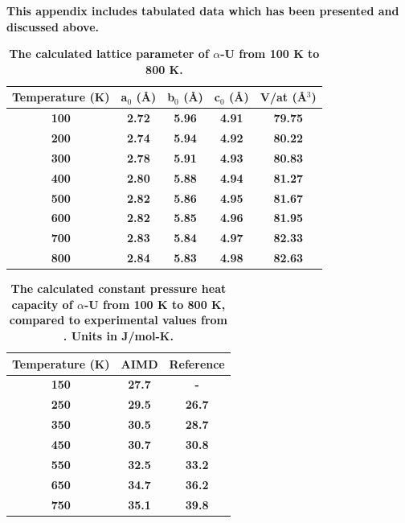 \documentclass[utf8]{frontiersSCNS} %
\providecommand{\DIFaddtex}[1]{{\bf #1}} %
\providecommand{\DIFaddFL}[1]{\DIFadd{#1}} %
\providecommand{\DIFadd}[1]{\texorpdfstring{\DIFaddtex{#1}}{#1}} %
\begin{document}
\DIFadd{This appendix includes tabulated data which has been presented and discussed above. 
}

\setcounter{table}{0}
\renewcommand{\thetable}{A\arabic{table}}

\begin{table}[h]
\caption{\DIFaddFL{The calculated lattice parameter of $\alpha$-U from 100 K to 800 K.}} \label{tab:lat}
\begin{center}
\begin{tabular}{|c|c|c|c|c|}
	\hline
	\DIFaddFL{Temperature (K) }& \DIFaddFL{a$_0$ (\AA) }& \DIFaddFL{b$_0$ (\AA) }& \DIFaddFL{c$_0$ (\AA) }& \DIFaddFL{V/at (\AA$^3$) }\\
	 \hline
\DIFaddFL{100 }&	\DIFaddFL{2.72	}& \DIFaddFL{5.96	}& \DIFaddFL{4.91 }&	\DIFaddFL{79.75 }\\
\DIFaddFL{200 }&	\DIFaddFL{2.74 }&	\DIFaddFL{5.94 }&	\DIFaddFL{4.92 }&	\DIFaddFL{80.22  }\\
\DIFaddFL{300 }&	\DIFaddFL{2.78	}& \DIFaddFL{5.91 }&	\DIFaddFL{4.93	}& \DIFaddFL{80.83 }\\
\DIFaddFL{400 }&	\DIFaddFL{2.80 }&	\DIFaddFL{5.88 }&	\DIFaddFL{4.94	}& \DIFaddFL{81.27 }\\
\DIFaddFL{500 }&	\DIFaddFL{2.82 }&	\DIFaddFL{5.86 }&	\DIFaddFL{4.95	}& \DIFaddFL{81.67 }\\
\DIFaddFL{600 }&	\DIFaddFL{2.82 }&	\DIFaddFL{5.85 }&	\DIFaddFL{4.96	}& \DIFaddFL{81.95 }\\
\DIFaddFL{700 }&	\DIFaddFL{2.83 }&	\DIFaddFL{5.84 }&	\DIFaddFL{4.97	 }& \DIFaddFL{82.33 }\\
\DIFaddFL{800 }&	\DIFaddFL{2.84 }&	\DIFaddFL{5.83 }&	\DIFaddFL{4.98	}& \DIFaddFL{82.63 }\\
	 \hline
\end{tabular}
\end{center}
\label{default}
\end{table}

\begin{table}[h]
\caption{\DIFaddFL{The calculated constant pressure heat capacity of $\alpha$-U from 100 K to 800 K, compared to experimental values from \cite{konings2010}. Units in J/mol-K.}} \label{tab:cp}
\begin{center}
\begin{tabular}{|c|c|c|}
	\hline
	\DIFaddFL{Temperature (K) }& \DIFaddFL{AIMD }& \DIFaddFL{Reference }\\
	 \hline
\DIFaddFL{150 }&	\DIFaddFL{27.7	}& \DIFaddFL{-	 }\\
\DIFaddFL{250 }&	\DIFaddFL{29.5 }& \DIFaddFL{26.7  }\\
\DIFaddFL{350 }&	\DIFaddFL{30.5	}& \DIFaddFL{28.7 }\\
\DIFaddFL{450 }&	\DIFaddFL{30.7 }& \DIFaddFL{30.8  }\\
\DIFaddFL{550 }&	\DIFaddFL{32.5 }& \DIFaddFL{33.2  }\\
\DIFaddFL{650 }&	\DIFaddFL{34.7 }& \DIFaddFL{36.2  }\\
\DIFaddFL{750 }&	\DIFaddFL{35.1 }& \DIFaddFL{39.8  }\\
	 \hline
\end{tabular}
\end{center}
\label{default}
\end{table}
\end{document}
